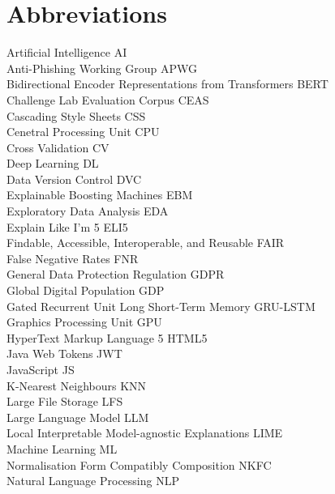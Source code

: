 
\section*{Abbreviations}

\large
Artificial Intelligence \hfill AI\\
Anti-Phishing Working Group \hfill APWG\\
Bidirectional Encoder Representations from Transformers \hfill BERT\\
Challenge Lab Evaluation Corpus \hfill CEAS\\
Cascading Style Sheets \hfill CSS\\
Cenetral Processing Unit \hfill CPU\\
Cross Validation \hfill CV\\
Deep Learning \hfill DL\\
Data Version Control \hfill DVC\\
Explainable Boosting Machines \hfill EBM\\
Exploratory Data Analysis \hfill EDA\\
Explain Like I'm 5 \hfill ELI5\\
Findable, Accessible, Interoperable, and Reusable \hfill FAIR \\
False Negative Rates \hfill FNR\\
General Data Protection Regulation \hfill GDPR\\
Global Digital Population \hfill GDP\\
Gated Recurrent Unit Long Short-Term Memory \hfill GRU-LSTM\\
Graphics Processing Unit \hfill GPU\\
HyperText Markup Language 5 \hfill HTML5\\
Java Web Tokens \hfill JWT\\
JavaScript \hfill JS\\
K-Nearest Neighbours \hfill KNN\\
Large File Storage \hfill LFS\\
Large Language Model \hfill LLM\\
Local Interpretable Model-agnostic Explanations \hfill LIME\\
Machine Learning \hfill ML\\
Normalisation Form Compatibly Composition \hfill NKFC\\
Natural Language Processing \hfill NLP\\
